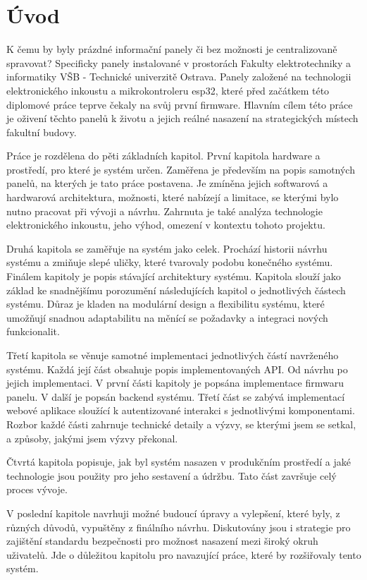\chapter{Úvod}

K čemu by byly prázdné informační panely či bez možnosti je centralizovaně spravovat? Specificky panely instalované v prostorách Fakulty elektrotechniky a informatiky VŠB - Technické univerzitě Ostrava. Panely založené na technologii elektronického inkoustu a mikrokontroleru esp32, které před začátkem této diplomové práce teprve čekaly na svůj první firmware. Hlavním cílem této práce je oživení těchto panelů k životu a jejich reálné nasazení na strategických místech fakultní budovy.

Práce je rozdělena do pěti základních kapitol. První kapitola  hardware a prostředí, pro které je systém určen. Zaměřena je především na popis samotných panelů, na kterých je tato práce postavena. Je zmíněna jejich softwarová a hardwarová architektura, možnosti, které nabízejí a limitace, se kterými bylo nutno pracovat při vývoji a návrhu. Zahrnuta je také analýza technologie elektronického inkoustu, jeho výhod, omezení v kontextu tohoto projektu.

Druhá kapitola se zaměřuje na systém jako celek. Prochází historii návrhu systému a zmiňuje slepé uličky, které tvarovaly podobu konečného systému. Finálem kapitoly je popis stávající architektury systému. Kapitola slouží jako základ ke snadnějšímu porozumění následujících kapitol o jednotlivých částech systému. Důraz je kladen na modulární design a flexibilitu systému, které umožňují snadnou adaptabilitu na měnící se požadavky a integraci nových funkcionalit.

Třetí kapitola se věnuje samotné implementaci jednotlivých částí navrženého systému. Každá její část obsahuje popis implementovaných API. Od návrhu po jejich implementaci. V první části kapitoly je popsána implementace firmwaru panelu. V další je popsán backend systému. Třetí část se zabývá implementací webové aplikace sloužící k autentizované interakci s jednotlivými komponentami. Rozbor každé části zahrnuje technické detaily a výzvy, se kterými jsem se setkal, a způsoby, jakými jsem výzvy překonal.

Čtvrtá kapitola popisuje, jak byl systém nasazen v produkčním prostředí a jaké technologie jsou použity pro jeho sestavení a údržbu. Tato část završuje celý proces vývoje.

V poslední kapitole navrhuji možné budoucí úpravy a vylepšení, které byly, z různých důvodů, vypuštěny z finálního návrhu. Diskutovány jsou i strategie pro zajištění standardu bezpečnosti pro možnost nasazení mezi široký okruh uživatelů. Jde o důležitou kapitolu pro navazující práce, které by rozšiřovaly tento systém.
